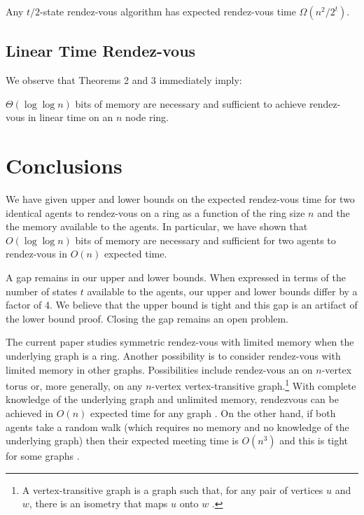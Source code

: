 \documentclass[acmtoalg]{acmtrans2m}
\begin{document}
\begin{thm}
Any $t/2$-state rendez-vous algorithm has expected rendez-vous time
$\Omega(n^2/2^{t})$.
\end{thm}

\subsection{Linear Time Rendez-vous}

We observe that Theorems 2 and 3 immediately imply:

\begin{thm}
$\Theta( \log \log n)$ bits of memory are necessary and sufficient to 
achieve rendez-vous in linear time on an $n$ node ring.
\end{thm}

\section{Conclusions}

We have given upper and lower bounds on the expected rendez-vous time
for two identical agents to rendez-vous on a ring as a function of the
ring size $n$ and the the memory available to the agents.  In
particular, we have shown that $O(\log\log n)$ bits of memory are
necessary and sufficient for two agents to rendez-vous in $O(n)$
expected time.

A gap remains in our upper and lower bounds.  When expressed in terms
of the number of states $t$ available to the agents, our upper and
lower bounds differ by a factor of 4.  We believe that the upper bound
is tight and this gap is an artifact of the lower bound proof.
Closing the gap remains an open problem.

The current paper studies symmetric rendez-vous with limited memory
when the underlying graph is a ring. Another possibility is to consider
rendez-vous with limited memory in other graphs.  Possibilities include
rendez-vous an on $n$-vertex torus or, more generally, on any $n$-vertex
vertex-transitive graph.\footnote{A vertex-transitive graph is a graph
such that, for any pair of vertices $u$ and $w$, there is an isometry that
maps $u$ onto $w$ \cite[Chapter~15]{alpernGal03}.} With complete knowledge
of the underlying graph and unlimited memory, rendezvous can be achieved
in $O(n)$ expected time for any graph \cite[Section~15.2]{alpernGal03}.
On the other hand, if both agents take a random walk (which requires
no memory and no knowledge of the underlying graph) then their
expected meeting time is $O(n^3)$ and this is tight for some graphs
\cite{coppersmith}.





\end{document}
